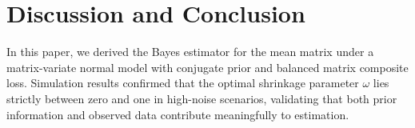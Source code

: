 \documentclass[twoside]{article}
\begin{document}
\section*{Discussion and Conclusion}  
In this paper, we derived the Bayes estimator for the mean matrix under a matrix-variate normal model with conjugate prior and balanced matrix composite loss. Simulation results confirmed that the optimal shrinkage parameter $\omega$ lies strictly between zero and one in high-noise scenarios, validating that both prior information and observed data contribute meaningfully to estimation.

 
\end{document}
